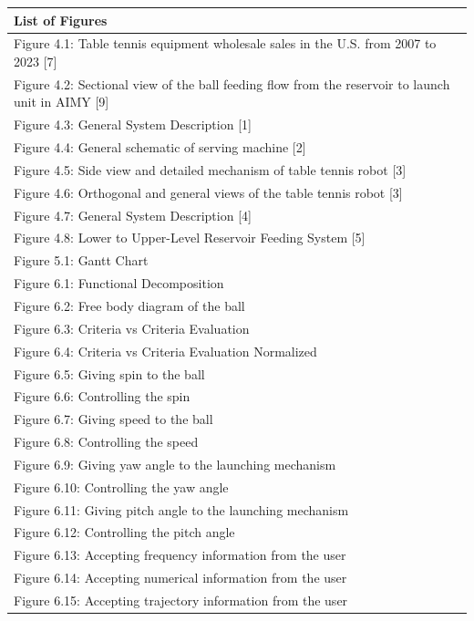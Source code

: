 \documentclass[12pt]{report}
\begin{document}
\begin{table}[h!]
\centering
\begin{tabular}{|p{15cm}|}
\hline
\textbf{List of Figures} \\ \hline
Figure 4.1: Table tennis equipment wholesale sales in the U.S. from 2007 to 2023 [7] \\ \hline
Figure 4.2: Sectional view of the ball feeding flow from the reservoir to launch unit in AIMY [9] \\ \hline
Figure 4.3: General System Description [1] \\ \hline
Figure 4.4: General schematic of
serving machine [2] \\ \hline
Figure 4.5: Side view and detailed
mechanism of table tennis robot [3] \\ \hline
Figure 4.6: Orthogonal and general views of the table tennis robot [3] \\ \hline
Figure 4.7: General System Description [4] \\ \hline
Figure 4.8: Lower to Upper-Level Reservoir Feeding System [5] \\ \hline
Figure 5.1: Gantt Chart \\ \hline
Figure 6.1: Functional Decomposition \\ \hline
Figure 6.2: Free body diagram of the ball \\ \hline
Figure 6.3: Criteria vs Criteria Evaluation
\\ \hline
Figure 6.4: Criteria vs Criteria Evaluation Normalized \\ \hline
Figure 6.5: Giving spin to the ball \\ \hline
Figure 6.6: Controlling the spin \\ \hline
Figure 6.7: Giving speed to the ball \\ \hline
Figure 6.8: Controlling the speed \\ \hline
Figure 6.9: Giving yaw angle to the launching mechanism \\ \hline
Figure 6.10: Controlling the yaw angle \\ \hline
Figure 6.11: Giving pitch angle to the launching mechanism \\ \hline
Figure 6.12: Controlling the pitch angle \\ \hline
Figure 6.13: Accepting frequency information from the user \\ \hline
Figure 6.14: Accepting numerical information from the user \\ \hline
Figure 6.15: Accepting trajectory information from the user \\ \hline

\end{tabular}
\end{table}
\end{document}
